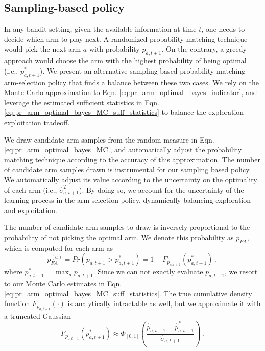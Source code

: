 \documentclass[10pt]{article}
\newcommand{\ie}{i.e., }
\begin{document}
\subsection{Sampling-based policy}
\label{ssec:sampling_policy}

In any bandit setting, given the available information at time $t$, one needs to decide which arm to play next. A randomized probability matching technique would pick the next arm $a$ with probability $p_{a,t+1}$. On the contrary, a greedy approach would choose the arm with the highest probability of being optimal (\ie $p^*_{a,t+1}$). We present an alternative sampling-based probability matching arm-selection policy that finds a balance between these two cases. We rely on the Monte Carlo approximation to Eqn. \ref{eq:pr_arm_optimal_bayes_indicator}, and leverage the estimated sufficient statistics in Eqn. \ref{eq:pr_arm_optimal_bayes_MC_suff_statistics} to balance the exploration-exploitation tradeoff. 

We draw candidate arm samples from the random measure in Eqn. \ref{eq:pr_arm_optimal_bayes_MC}, and automatically adjust the probability matching technique according to the accuracy of this approximation. The number of candidate arm samples drawn is instrumental for our sampling based policy. We automatically adjust its value according to the uncertainty on the optimality of each arm (\ie $\hat{\sigma}^2_{a,t+1}$). By doing so, we account for the uncertainty of the learning process in the arm-selection policy, dynamically balancing exploration and exploitation.

The number of candidate arm samples to draw is inversely proportional to the probability of not picking the optimal arm. We denote this probability as $p_{FA}$, which is computed for each arm as
\begin{equation}
p_{FA}^{(a)} =Pr\left(p_{a,t+1} > p^*_{a,t+1} \right) = 1 - F_{p_{a,t+1}}(p^*_{a,{t+1}}) \; ,
\end{equation}
where $p_{a,t+1}^*=\max_{a}p_{a,t+1}$. Since we can not exactly evaluate $p_{a,t+1}$, we resort to our Monte Carlo estimates in Eqn. \ref{eq:pr_arm_optimal_bayes_MC_suff_statistics}. The true cumulative density function $F_{p_{a,t+1}}(\cdot)$ is analytically intractable as well, but we approximate it with a truncated Gaussian
\begin{equation}
F_{p_{a,t+1}}(p^*_{a,{t+1}}) \approx \Phi_{[0,1]}\left(\frac{\hat{p}_{a,t+1} - \hat{p}^*_{a,{t+1}}}{\hat{\sigma}_{a,t+1}}\right) \;.
\end{equation}
\end{document}
